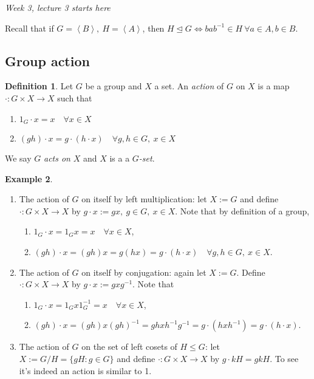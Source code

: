 \documentclass[a4paper]{article}
\newcommand{\la}{\left\langle}
\newcommand{\ra}{\right\rangle}
\theoremstyle{definition}
\newtheorem{defn}{Definition}[subsection]
\newtheorem{example}[defn]{Example}
\begin{document}
\begin{flushright}
\textit{Week 3, lecture 3 starts here}
\end{flushright}

Recall that if $G=\la B\ra,\ H=\la A\ra$, then $H\unlhd G\Leftrightarrow bab^{-1}\in H \ \forall a\in A, b\in B$.

\subsection{Group action}
\begin{defn}
Let $G$ be a group and $X$ a set. An \textit{action} of $G$ on $X$ is a map $\cdot:G\times X\rightarrow X$ such that
\begin{enumerate}
\item $1_G\cdot x=x \quad \forall x\in X$
\item $(gh)\cdot x = g\cdot (h\cdot x) \quad \forall g,h\in G,\ x\in X$
\end{enumerate}
We say $G$ \textit{acts on} $X$ and $X$ is a a $G$\textit{-set}.
\end{defn}

\begin{example}
\label{example:gpaction}
\begin{enumerate}
\item The action of $G$ on itself by left multiplication: let $X:=G$ and define $\cdot :G\times X\rightarrow X$ by $g\cdot x:= gx,\ g\in G,\ x\in X$. Note that by definition of a group,
\begin{enumerate}
\item $1_G\cdot x=1_Gx=x \quad \forall x\in X$,
\item $(gh)\cdot x = (gh)x=g(hx)=g\cdot(h\cdot x) \quad \forall g,h\in G,\ x\in X$.
\end{enumerate}
\item The action of $G$ on itself by conjugation: again let $X:=G$. Define $\cdot :G\times X\rightarrow X$ by $g\cdot x := gxg^{-1}$. Note that
\begin{enumerate}
\item $1_G\cdot x = 1_G x 1_G^{-1}=x \quad \forall x\in X$,
\item $(gh)\cdot x=(gh)x(gh)^{-1}=ghxh^{-1}g^{-1}=g\cdot \left(hxh^{-1}\right)=g\cdot (h\cdot x)$.
\end{enumerate}
\item The action of $G$ on the set of left cosets of $H\leq G$: let $X:=G/H=\{gH:g\in G\}$ and define $\cdot : G\times X\rightarrow X$ by $g\cdot kH=gkH$. To see it's indeed an action is similar to 1.
\end{enumerate} 
\end{example}
\end{document}
